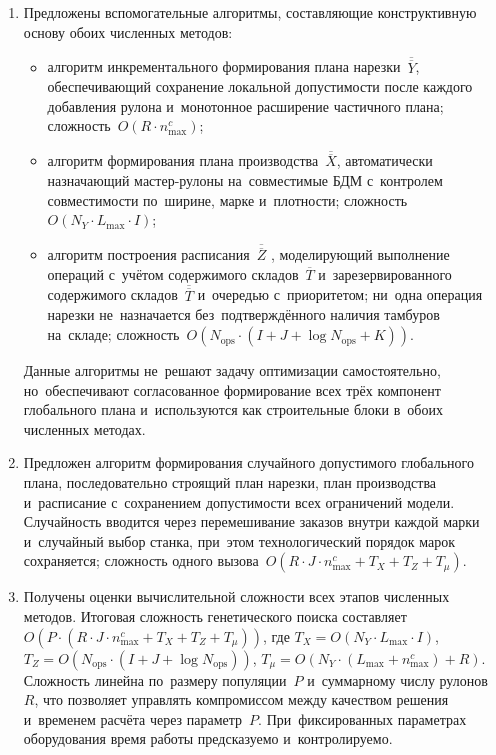 \begin{enumerate}
  \item Предложены вспомогательные алгоритмы, составляющие конструктивную основу обоих численных методов:
  \begin{itemize}
    \item алгоритм инкрементального формирования плана нарезки~$\overline{\overline{Y}}$, обеспечивающий сохранение локальной допустимости после каждого добавления рулона и~монотонное расширение частичного плана; сложность~$O(R\cdot n^c_{\max})$;
    \item алгоритм формирования плана производства~$\overline{\overline{X}}$, автоматически назначающий мастер-рулоны на~совместимые БДМ с~контролем совместимости по~ширине, марке и~плотности; сложность~$O(N_Y\cdot L_{\max}\cdot I)$;
    \item алгоритм построения расписания~$\overline{\overline{Z}}$ , моделирующий выполнение операций с~учётом содержимого складов~$\overline{T}$ и~зарезервированного содержимого складов~$\overline{\overline{T}}$ и~очередью с~приоритетом; ни~одна операция нарезки не~назначается без~подтверждённого наличия тамбуров на~складе; сложность~$O(N_{\mathrm{ops}}\cdot(I+J+\log N_{\mathrm{ops}}+K))$.
  \end{itemize}
  Данные алгоритмы не~решают задачу оптимизации самостоятельно, но~обеспечивают согласованное формирование всех трёх компонент глобального плана и~используются как строительные блоки в~обоих численных методах.

  \item Предложен алгоритм формирования случайного допустимого глобального плана, последовательно строящий план нарезки, план производства и~расписание с~сохранением допустимости всех ограничений модели.
  Случайность вводится через перемешивание заказов внутри каждой марки и~случайный выбор станка, при~этом технологический порядок марок сохраняется; сложность одного вызова~$O(R\cdot J\cdot n^c_{\max}+T_X+T_Z+T_\mu)$.

  \item Получены оценки вычислительной сложности всех этапов численных методов.
  Итоговая сложность генетического поиска составляет $O(P\cdot(R\cdot J\cdot n^c_{\max}+T_X+T_Z+T_\mu))$, где $T_X=O(N_Y\cdot L_{\max}\cdot I)$, $T_Z=O(N_{\mathrm{ops}}\cdot(I+J+\log N_{\mathrm{ops}}))$, $T_\mu=O(N_Y\cdot(L_{\max}+n^c_{\max})+R)$.
  Сложность линейна по~размеру популяции~$P$ и~суммарному числу рулонов~$R$, что позволяет управлять компромиссом между качеством решения и~временем расчёта через параметр~$P$.
  При~фиксированных параметрах оборудования время работы предсказуемо и~контролируемо.


\end{enumerate}

